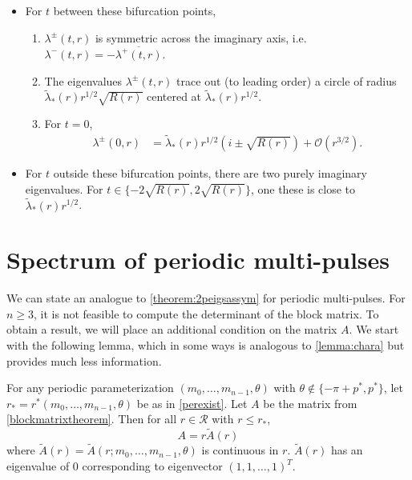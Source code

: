 \documentclass[thesis.tex]{subfiles}
\begin{document}
\begin{theorem}
\begin{itemize}
\item For $t$ between these bifurcation points, 
\begin{enumerate}
\item $\lambda^\pm(t, r)$ is symmetric across the imaginary axis, i.e. $\lambda^-(t, r) = -\overline{\lambda^+(t, r)}$. 
\item The eigenvalues $\lambda^\pm(t, r)$ trace out (to leading order) a circle of radius $\tilde{\lambda}_*(r) r^{1/2} \sqrt{ R(r)}$ centered at $\tilde{\lambda}_*(r) r^{1/2}$. 
\item For $t = 0$,
\begin{align*}
\lambda^\pm(0, r) &= \tilde{\lambda}_*(r) r^{1/2}\left(  i \pm \sqrt{ R(r)} \right)  + \mathcal{O}\left( r^{3/2} \right).
\end{align*}
\end{enumerate}

\item For $t$ outside these bifurcation points, there are two purely imaginary eigenvalues. For $t \in \{ -2\sqrt{R(r)}, 2\sqrt{R(r)} \}$, one these is close to $\tilde{\lambda}_*(r) r^{1/2}$.

\end{itemize}

\end{theorem}

\section{Spectrum of periodic multi-pulses}\label{sec:pereig}

We can state an analogue to \cref{theorem:2peigsassym} for periodic multi-pulses. For $n \geq 3$, it is not feasible to compute the determinant of the block matrix. To obtain a result, we will place an additional condition on the matrix $A$. We start with the following lemma, which in some ways is analogous to \cref{lemma:chara} but provides much less information.

\begin{lemma}\label{lemma:charmatrixA}
For any periodic parameterization $(m_0, \dots, m_{n-1}, \theta)$ with $\theta \notin \{-\pi + p^*, p^* \}$, let $r_* = r^*(m_0, \dots, m_{n-1}, \theta)$ be as in \cref{perexist}. Let $A$ be the matrix from \cref{blockmatrixtheorem}. Then for all $r \in \mathcal{R}$ with $r \leq r_*$,
\[
A = r \tilde{A}(r)
\]
where $\tilde{A}(r) = \tilde{A}(r; m_0, \dots, m_{n-1}, \theta)$ is continuous in $r$. $\tilde{A}(r)$ has an eigenvalue of 0 corresponding to eigenvector $(1, 1, \dots, 1)^T$. 
\end{lemma}
\end{document}
